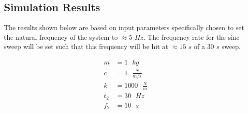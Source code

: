\documentclass [a4paper, 12pt]{article}
\begin{document}
\subsection *{Simulation Results}
The results shown below are based on input parameters specifically chosen to set the natural frequency of the system to $\approx5$ $Hz$.  The frequency rate for the sine sweep will be set such that this frequency will be hit at $\approx 15$ $s$ of a $30$ $s$ sweep.

\begin{align*}
	m &= 1 \text{ } kg\\
	c &= 1 \text{ } \frac{N}{m/s}\\
	k &= 1000 \text{ } \frac{N}{m}\\
	t_2 &= 30\text{ }Hz\\
	f_2 &= 10\text{ }s
\end{align*}
\end{document}
